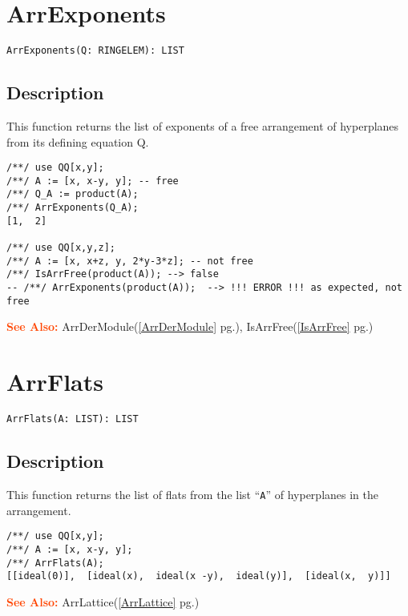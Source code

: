 \documentclass[a4paper]{mybook}
\newenvironment{command}{}{} %
\newcommand\SeeAlso{\par\textcolor{OrangeRed}{\textbf{\large See Also: }}}
\begin{document}
\section{ArrExponents}
\label{ArrExponents}
\begin{command} %


\begin{Verbatim}[label=syntax, rulecolor=\color{MidnightBlue},
frame=single]
ArrExponents(Q: RINGELEM): LIST 
\end{Verbatim}


\subsection*{Description}

This function returns the list of exponents of a free arrangement of hyperplanes from its defining equation Q.
\begin{Verbatim}[label=example, rulecolor=\color{PineGreen}, frame=single]
/**/ use QQ[x,y];	
/**/ A := [x, x-y, y]; -- free
/**/ Q_A := product(A);	
/**/ ArrExponents(Q_A);
[1,  2]
	
/**/ use QQ[x,y,z];    
/**/ A := [x, x+z, y, 2*y-3*z]; -- not free
/**/ IsArrFree(product(A)); --> false
-- /**/ ArrExponents(product(A));  --> !!! ERROR !!! as expected, not free
\end{Verbatim}


\SeeAlso %
  ArrDerModule(\ref{ArrDerModule} pg.\pageref{ArrDerModule}), 
    IsArrFree(\ref{IsArrFree} pg.\pageref{IsArrFree})
\end{command} %

\section{ArrFlats}
\label{ArrFlats}
\begin{command} %


\begin{Verbatim}[label=syntax, rulecolor=\color{MidnightBlue},
frame=single]
ArrFlats(A: LIST): LIST
\end{Verbatim}


\subsection*{Description}

This function returns the list of flats from the list ``\verb&A&'' of hyperplanes
in the arrangement.
\begin{Verbatim}[label=example, rulecolor=\color{PineGreen}, frame=single]
/**/ use QQ[x,y];	
/**/ A := [x, x-y, y];
/**/ ArrFlats(A);
[[ideal(0)],  [ideal(x),  ideal(x -y),  ideal(y)],  [ideal(x,  y)]]
\end{Verbatim}


\SeeAlso %
  ArrLattice(\ref{ArrLattice} pg.\pageref{ArrLattice})
\end{command} %
\end{document}
